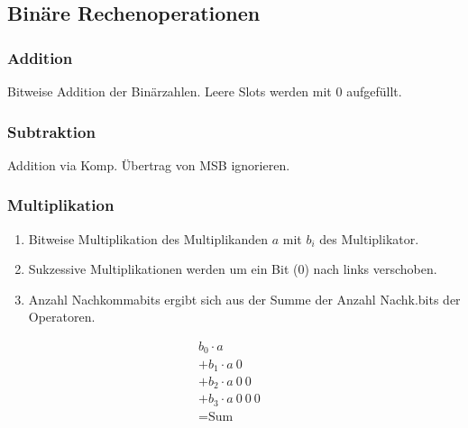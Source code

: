 \subsection{Binäre Rechenoperationen}
\begin{center}
    \begin{minipage}{0.45\linewidth}
        \subsubsection{Addition}
        Bitweise Addition der Binärzahlen. Leere Slots werden mit $0$ aufgefüllt.
    \end{minipage}
    \hfill
    \begin{minipage}{0.45\linewidth}
        \subsubsection{Subtraktion}
        Addition via \twocom Komp. Übertrag von MSB ignorieren.
    \end{minipage}
\end{center}
\subsubsection{Multiplikation}
\begin{center}
    \begin{minipage}[t]{0.70\linewidth}
        \begin{enumerate}
            \item Bitweise Multiplikation des Multiplikanden $a$ mit $b_i$ des Multiplikator.
            \item Sukzessive Multiplikationen werden um ein Bit ($0$) nach links verschoben.
            \item Anzahl Nachkommabits ergibt sich aus der Summe der Anzahl Nachk.bits der Operatoren.
        \end{enumerate}
    \end{minipage}
    \hfill
    \begin{minipage}[t]{0.25\linewidth}
        \begin{align*}
            b_0 \cdot a&\\
            +b_1 \cdot a~0\\
            +b_2 \cdot a~0~0&\\
            +b_3 \cdot a~0~0~0&\\
            \hline
            =\text{Sum}&
        \end{align*}
    \end{minipage}
\end{center}
